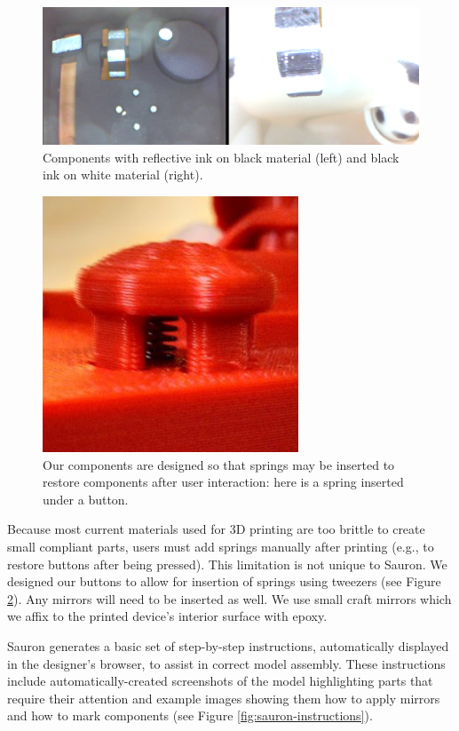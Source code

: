 \begin{figure}
\centering
\includegraphics[width=\textwidth]{figures/sauron/distinctive-materials.png}
\caption{Components with reflective ink on black material (left) and black ink on white material (right).}
\label{fig:sauron-distinctiveness}
\end{figure}

\begin{figure}
\centering
\includegraphics[width=3in]{figures/sauron/button-spring.jpg}
\caption{Our components are designed so that springs may be inserted to restore components after user interaction: here is a spring inserted under a button.}
\label{fig:sauron-spring}
\end{figure}

Because most current materials used for 3D printing are too brittle to create small compliant parts, users must add springs manually after printing (e.g., to restore buttons after being pressed). This limitation is not unique to Sauron. We designed our buttons to allow for insertion of springs using tweezers (see Figure \ref{fig:sauron-spring}). Any mirrors will need to be inserted as well. We use small craft mirrors which we affix to the printed device's interior surface with epoxy.

Sauron generates a basic set of step-by-step instructions, automatically displayed in the designer's browser, to assist in correct model assembly. These instructions include automatically-created screenshots of the model highlighting parts that require their attention and example images showing them how to apply mirrors and how to mark components (see Figure \ref{fig:sauron-instructions}).%

